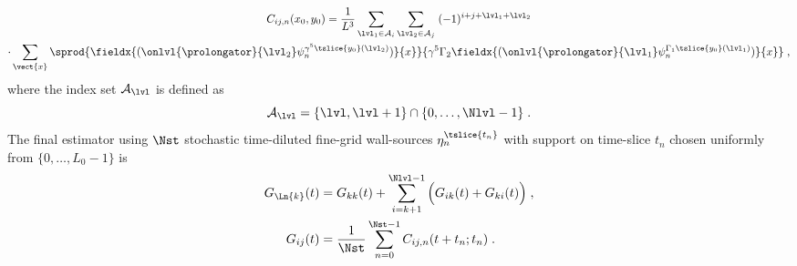 \begin{multline}
C_{ij,n}(x_0, y_0)
= \frac{1}{L^{3}}
\sum_{\lvl_1 \in \mathcal{A}_i} \sum_{\lvl_2 \in \mathcal{A}_j} \;
(-1)^{i+j + \lvl_1 + \lvl_2} \\
\cdot \sum_{\vect{x}} \sprod{
  \fieldx{( \onlvl{\mathcal{\prolongator}}{\lvl_2}\psi_{n}^{\gamma^{5} \tslice{y_0} (\lvl_2)})}{x}
}{
  \gamma^{5}
  \Gamma_2
  \fieldx{( \onlvl{\mathcal{\prolongator}}{\lvl_1}\psi_{n}^{\Gamma_1 \tslice{y_0} (\lvl_1)})}{x}
} \;,
\end{multline}
where the index set $\mathcal{A}_\lvl$ is defined as
\begin{equation}
\mathcal{A}_\lvl = \{\lvl,\lvl+1\} \cap \{0, \ldots, \Nlvl-1\} \;.
\end{equation}
The final estimator using $\Nst$ stochastic time-diluted fine-grid wall-sources $\eta_n^{\tslice{t_n}}$ with support on time-slice $t_n$ chosen uniformly from $\{0, \ldots, L_0 - 1\}$ is
\begin{align} \label{eq:stoch:Gij:final}
G_{\Ln{k}}(t) &= G_{kk}(t) + \sum_{i=k+1}^{\Nlvl-1} \Big( G_{ik}(t) + G_{ki}(t) \Big) \;, \\
G_{ij}(t) &= \frac{1}{\Nst} \sum_{n=0}^{\Nst-1} C_{ij,n}(t+t_n;t_n) \;.
\end{align}

